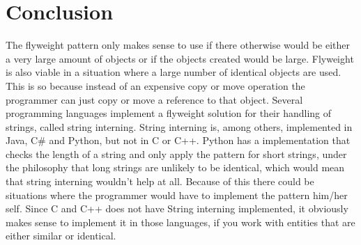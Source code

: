 \FloatBarrier
\section{Conclusion}
The flyweight pattern only makes sense to use if there otherwise would be either a very large amount of objects or if the objects created would be large.
Flyweight is also viable in a situation where a large number of identical objects are used. This is so because instead of an expensive copy or move operation the programmer can just copy or move a reference to that object.
Several programming languages implement a flyweight solution for their handling of strings, called string interning.
String interning is, among others, implemented in Java, C\# and Python, but not in C or C++. Python has a implementation that checks the length of a string and only apply the pattern for short strings, under the philosophy that long strings are unlikely to be identical, which would mean that string interning wouldn't help at all. Because of this there could be situations where the programmer would have to implement the pattern him/her self.
Since C and C++ does not have String interning implemented, it obviously makes sense to implement it in those languages, if you work with entities that are either similar or identical.